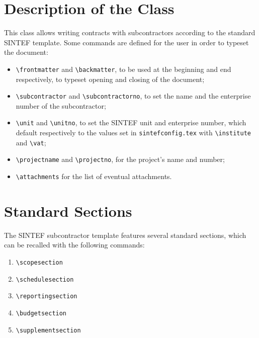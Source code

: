 \documentclass{sintefsubcontractor}
\begin{document}
\frontmatter

\section{Description of the Class}
This class allows writing contracts with subcontractors according to the
standard SINTEF template.
Some commands are defined for the user in order to typeset the document:
\begin{itemize}
  \item \verb|\frontmatter| and \verb|\backmatter|, to be used at the
        beginning and end respectively, to typeset opening and closing
        of the document;
  \item \verb|\subcontractor| and \verb|\subcontractorno|, to set the name and
        the enterprise number of the subcontractor;
  \item \verb|\unit| and \verb|\unitno|, to set the SINTEF unit and
        enterprise number, which default respectively to the values
        set in \texttt{sintefconfig.tex} with \verb|\institute| and
        \verb|\vat|;
  \item \verb|\projectname| and \verb|\projectno|, for the project's
        name and number;
  \item \verb|\attachments| for the list of eventual attachments.
\end{itemize}

\section{Standard Sections}
The SINTEF subcontractor template features several standard sections,
which can be recalled with the following commands:
\begin{enumerate}
  \item \verb|\scopesection|
  \item \verb|\schedulesection|
  \item \verb|\reportingsection|
  \item \verb|\budgetsection|
  \item \verb|\supplementsection|
\end{enumerate}

\backmatter
\end{document}
